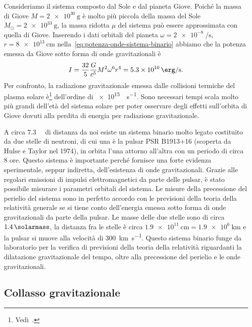 Consideriamo il sistema composto dal Sole e dal pianeta Giove.  Poiché la massa
di Giove $M = \SI{2e30}{\gram}$ è molto più piccola della massa del Sole
$M_{\odot} = \SI{2e33}{\gram}$, la massa ridotta $\mu$ del sistema può essere
approssimata con quella di Giove.  Inserendo i dati orbitali del pianeta
$\omega = \SI[per-mode=reciprocal]{2e-8}{\per\second}$,
$r = \SI{8e13}{\centi\metre}$ nella~\eqref{eq:potenza-onde-sistema-binario}
abbiamo che la potenza emessa da Giove sotto forma di onde gravitazionali è
\begin{equation}
  I = \frac{32}{5} \frac{G}{c^{5}} M^{2} \omega^{6} r^{4} =
  \SI{5.3e10}{\erg\per\second}.
\end{equation}
Per confronto, la radiazione gravitazionale emessa dalle collisioni termiche del
plasma solare è\footnote{Vedi~\textcite[266]{weinberg:gravitation}.}
dell'ordine di \SI{e15}{\erg\per\second}.  Sono necessari tempi scala molto più
grandi dell'età del sistema solare per poter osservare degli effetti sull'orbita
di Giove dovuti alla perdita di energia per radiazione gravitazionale.

A circa \SI{7.3}{\kilo\parsec} di distanza da noi esiste un sistema binario
molto legato costituito da due stelle di neutroni, di cui una è la pulsar PSR
B1913+16 (scoperta da Hulse e Taylor nel 1974), in orbita l'una attorno
all'altra con un periodo di circa $8$ ore.  Questo sistema è importante perché
fornisce una forte evidenza sperimentale, seppur indiretta, dell'esistenza di
onde gravitazionali.  Grazie alle regolari emissioni di impulsi elettromagnetici
da parte delle pulsar, è stato possibile misurare i parametri orbitali del
sistema.  Le misure della precessione del perielio del sistema sono in perfetto
accordo con le previsioni della teoria della relatività generale se si tiene
conto dell'energia emessa sotto forma di onde gravitazionali da parte della
pulsar.  Le masse delle due stelle sono di circa $\SI{1.4}{\solarmass}$, la
distanza fra le stelle è circa
$\SI{1.9e11}{\centi\metre} = \SI{1.9e6}{\kilo\metre}$ e la pulsar si muove alla
velocità di \SI{300}{\kilo\metre\per\second}.  Questo sistema binario funge da
laboratorio per la verifica di previsioni della teoria della relatività
riguardanti la dilatazione gravitazionale del tempo, oltre alla precessione del
perielio e le onde gravitazionali.

\subsection{Collasso gravitazionale}
\label{sec:collasso-grav}

